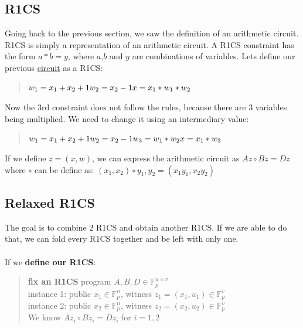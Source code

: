 \subsection{R1CS}
Going back to the previous section, we saw the definition of an arithmetic circuit.
R1CS is simply a representation of an arithmetic circuit.
A R1CS constraint has the form $a*b=y$, where $a$,$b$ and $y$ are combinations of variables.
Lets define our previous \hyperref[subsec:ac]{circuit} as a R1CS:   

\begin{quote}
$w_1 = x_1+x_2+1
\\
w_2 = x_2 -1
\\
x = x_1*w_1*w_2$
\end{quote}

Now the 3rd constraint does not follow the rules, because there are 3 variables being multiplied.
We need to change it using an intermediary value:

\begin{quote}
$w_1 = x_1+x_2+1
\\
w_2 = x_2 -1
\\
w_3 = w_1*w_2
\\
x = x_1*w_3$
\end{quote}
\cite{ZKM3}
If we define $z=(x,w)$, we can express the arithmetic circuit as $ Az \circ Bz = Dz$
where $\circ$ can be define as: $(x_1, x_2) \circ y_1, y_2 = (x_1y_1, x_2y_2)$
\cite{ZKM10}

\subsection{Relaxed R1CS}
The goal is to combine 2 R1CS and obtain another R1CS. If we are able to do that, we can fold every R1CS together and be left with only one.
\\
\\
If we \textbf{define our R1CS}:
\begin{quote}
\textbf{fix an R1CS} program $A,B,D \in \mathbb{F}^{u \times v}_p $
\\
instance 1: public $ x_1 \in \mathbb{F}^n_p $, witness $ z_1 = (x_1, u_1) \in \mathbb{F}^v_p$
\\
instance 2: public $x_2 \in \mathbb{F}^n_p $, witness $ z_2 = (x_2, u_2) \in \mathbb{F}^v_p$
\\
We know $Az_i \circ Bz_i = Dz_i$ for $ i = 1,2$
\end{quote}


